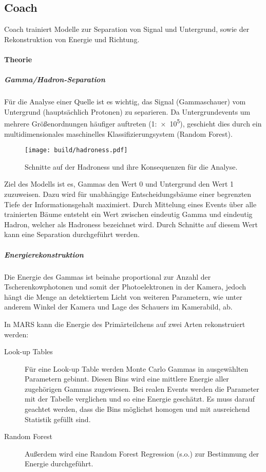 \subsection{Coach}%
\label{sub:coach}

Coach trainiert Modelle zur Separation von Signal und Untergrund,
sowie der Rekonstruktion von Energie und Richtung.

\paragraph{Theorie}%

\subparagraph{Gamma/Hadron-Separation}
Für die Analyse einer Quelle ist es wichtig,
das Signal (Gammaschauer) vom
Untergrund (hauptsächlich Protonen) zu separieren.
Da Untergrundevents um mehrere Größenordnungen häufiger auftreten (1:\num{e5}),
geschieht dies durch ein multidimensionales maschinelles
Klassifizierungsystem (Random Forest).

\begin{wrapfigure}[18]{L}{0.55\textwidth}
  \centering
  \texttt{[image: build/hadroness.pdf]}
  \caption{Schnitte auf der Hadroness und ihre Konsequenzen für die Analyse.}%
  \label{fig:uebersicht}
\end{wrapfigure}

Ziel des Modells ist es, Gammas den Wert 0 und Untergrund den Wert 1 zuzuweisen.
Dazu wird für unabhängige Entscheidungsbäume einer begrenzten Tiefe
der Informationsgehalt maximiert.
Durch Mittelung eines Events über alle trainierten Bäume entsteht ein Wert
zwischen eindeutig Gamma und eindeutig Hadron, welcher als Hadroness bezeichnet
wird.
Durch Schnitte auf diesem Wert kann eine Separation durchgeführt werden.

\subparagraph{Energierekonstruktion}%
\label{par:energie}

Die Energie des Gammas ist beinahe proportional
zur Anzahl der Tscherenkowphotonen
und somit der Photoelektronen in der Kamera,
jedoch hängt die Menge an detektiertem Licht von weiteren Parametern,
wie unter anderem Winkel der Kamera und Lage des Schauers im Kamerabild, ab.

In MARS kann die Energie des Primärteilchens auf zwei Arten rekonstruiert werden:
\begin{description}
	\item[\quad Look-up Tables] Für eine Look-up Table werden Monte Carlo
		Gammas in ausgewählten Parametern gebinnt.
		Diesen Bins wird eine mittlere Energie aller
		zugehörigen Gammas zugewiesen.
		Bei realen Events werden die Parameter mit der Tabelle verglichen
		und so eine Energie geschätzt.
		Es muss darauf geachtet werden,
		dass die Bins möglichst homogen und mit ausreichend Statistik gefüllt sind.
	\item[\quad Random Forest] Außerdem wird eine Random Forest Regression (s.o.)
		zur Bestimmung der Energie durchgeführt.
\end{description}

